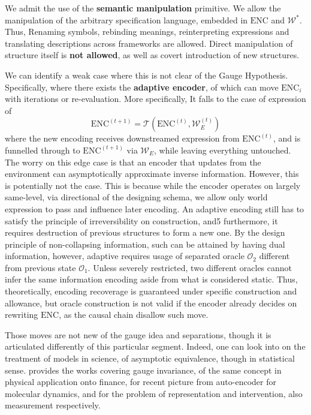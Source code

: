 \begin{lemma}
	We admit the use of the \textbf{semantic manipulation} primitive. We allow the manipulation of the arbitrary specification language, embedded in $\mathrm{ENC}$ and $\mathcal{W}^{*}$. Thus, Renaming symbols, rebinding meanings, reinterpreting expressions and translating descriptions across frameworks are allowed. Direct manipulation of structure itself is \textbf{not allowed}, as well as covert introduction of new structures. 
\end{lemma}

We can identify a weak case where this is not clear of the Gauge Hypothesis. Specifically, where there exists the \textbf{adaptive encoder}, of which can move $\mathrm{ENC}_{i}$ with iterations or re-evaluation. More specifically, It falls to the case of expression of
\begin{equation}
	\mathrm{ENC}^{(t+1)} = \mathcal{T}\left(\mathrm{ENC}^{(t)},\mathcal{W}_{E}^{(t)}\right)
\end{equation}
where the new encoding receives downstreamed expression from $\mathrm{ENC}^{(t)}$, and is funnelled through to $\mathrm{ENC}^{(t+1)}$ via $\mathcal{W}_{E}$, while leaving everything untouched. The worry on this edge case is that an encoder that updates from the environment can asymptotically approximate inverse information. However, this is potentially not the case. This is because while the encoder operates on largely same-level, via directional of the designing schema, we allow only world expression to pass and influence later encoding. An adaptive encoding still has to satisfy the principle of irreversibility on construction, and5 furthermore, it requires destruction of previous structures to form a new one. By the design principle of non-collapsing information, such can be attained by having dual information, however, adaptive requires usage of separated oracle $\mathcal{O}_{2}$ different from previous state $\mathcal{O}_{1}$. Unless severely restricted, two different oracles cannot infer the same information encoding aside from what is considered static. Thus, theoretically, encoding recoverage is guaranteed under specific construction and allowance, but oracle construction is not valid if the encoder already decides on rewriting $\mathrm{ENC}$, as the causal chain disallow such move. 

Those moves are not new of the gauge idea and separations, though it is articulated differently of this particular segment. Indeed, one can look into \cite{frigg_models_in_science_2010} on the treatment of models in science, \cite{lecam_asymptotic_1986,nussbaum_asymptotic_1996} of asymptotic equivalence, though in statistical sense. \cite{vazquez_gauge_2012} provides the works covering gauge invariance, \cite{ilinski_physics_of_finance_1997} of the same concept in physical application onto finance, \cite{wang_coarse-graining_2019} for recent picture from auto-encoder for molecular dynamics, and \cite{hacking_representing_1983,tal_measurement_2015} for the problem of representation and intervention, also measurement respectively. 

